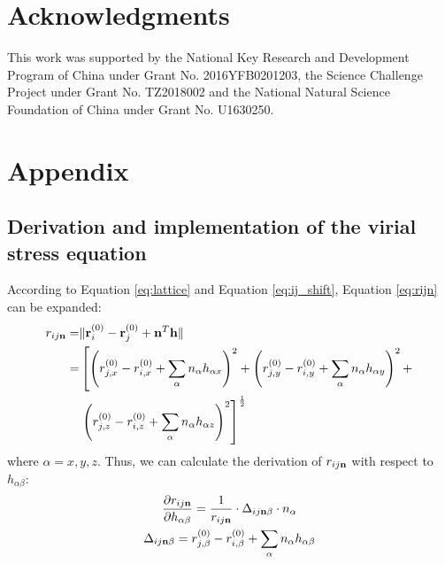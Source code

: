 \documentclass[preprint]{revtex4-2}
\begin{document}
% 
%
\section*{Acknowledgments}

This work was supported by the National Key Research and Development Program of 
China under Grant No. 2016YFB0201203, the Science Challenge Project under Grant 
No. TZ2018002 and the National Natural Science Foundation of China under Grant 
No. U1630250.

% 
%


\newpage

% 
%
\section*{Appendix}
\label{section:appendix}

% 
%
\subsection{Derivation and implementation of the virial stress equation}

According to Equation \ref{eq:lattice} and Equation \ref{eq:ij_shift}, Equation 
\ref{eq:rijn} can be expanded:
\begin{align}
r_{ij\mathbf{n}} = & \Vert \mathbf{r}_i^{(0)} - \mathbf{r}_j^{(0)} + 
           \mathbf{n}^T \mathbf{h} \Vert \nonumber \\
      = & \left[
                 \left(r_{j,x}^{(0)} - r_{i,x}^{(0)} + 
                       \sum_{\alpha}{n_{\alpha}h_{\alpha x}} \right)^2 +
                 \left(r_{j,y}^{(0)} - r_{i,y}^{(0)} + 
                       \sum_{\alpha}{n_{\alpha}h_{\alpha y}} \right)^2 + \right.
        \nonumber \\
        & \left. \left(r_{j,z}^{(0)} - r_{i,z}^{(0)} + 
                       \sum_{\alpha}{n_{\alpha}h_{\alpha z}} \right)^2 
          \right]^{\frac{1}{2}}
\end{align}
where $\alpha=x,y,z$. Thus, we can calculate the derivation of $r_{ij\mathbf{n}}$ with 
respect to $h_{\alpha\beta}$:
\begin{gather}
\frac{\partial r_{ij\mathbf{n}}}{\partial h_{\alpha\beta}} = 
    \frac{1}{r_{ij\mathbf{n}}} \cdot \Delta_{ij\mathbf{n}\beta} \cdot n_{\alpha} \\
\Delta_{ij\mathbf{n}\beta} = r_{j,\beta}^{(0)} - r_{i,\beta}^{(0)} + 
    \sum_{\alpha}{n_{\alpha}h_{\alpha \beta}}
\end{gather}
\end{document}
